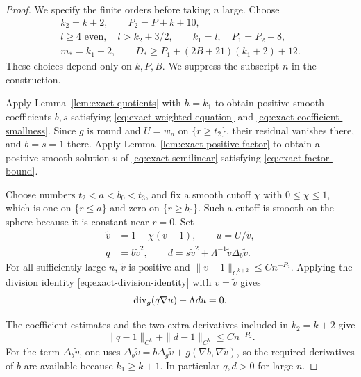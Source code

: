 \begin{proof}
We specify the finite orders before taking \(n\) large.  Choose
\begin{equation}
 \begin{gathered}
 k_2=k+2,\qquad P_2=P+k+10,\\
 l\ge4\text{ even},\quad l>k_2+3/2,\qquad
 k_1=l,\quad P_1=P_2+8,\\
 m_*=k_1+2,\qquad
 D_*\ge P_1+(2B+21)(k_1+2)+12.
 \end{gathered}
 \label{eq:exact-parameter-budget}
\end{equation}
These choices depend only on \(k,P,B\).  We suppress the subscript
\(n\) in the construction.

Apply Lemma~\ref{lem:exact-quotients} with \(h=k_1\) to obtain
positive smooth coefficients \(b,s\) satisfying
\eqref{eq:exact-weighted-equation} and
\eqref{eq:exact-coefficient-smallness}.  Since \(g\) is round and
\(U=w_n\) on \(\{r\ge t_2\}\), their residual vanishes there,
and \(b=s=1\) there.  Apply
Lemma~\ref{lem:exact-positive-factor} to obtain a positive smooth
solution \(v\) of \eqref{eq:exact-semilinear} satisfying
\eqref{eq:exact-factor-bound}.

Choose numbers \(t_2<a<b_0<t_3\), and fix a smooth cutoff \(\chi\)
with \(0\le\chi\le1\), which is one on \(\{r\le a\}\) and zero on
\(\{r\ge b_0\}\).
Such a cutoff is smooth on the sphere because it is constant near
\(r=0\).  Set
\begin{equation}
 \begin{aligned}
 \widetilde v&=1+\chi(v-1),\qquad u=U/\widetilde v,\\
 q&=b\widetilde v^2,\qquad
 d=s\widetilde v^2+\Lambda^{-1}\widetilde v\Delta_b\widetilde v.
 \end{aligned}
 \label{eq:exact-conjugation}
\end{equation}
For all sufficiently large \(n\), \(\widetilde v\) is positive and
\(\|\widetilde v-1\|_{C^{k+2}}\le Cn^{-P_2}\).  Applying the division
identity \eqref{eq:exact-division-identity} with
\(v=\widetilde v\) gives
\begin{equation}
 \operatorname{div}_g(q\nabla u)+\Lambda d u=0.
 \label{eq:exact-conjugated-equation}
\end{equation}

The coefficient estimates and the two extra derivatives included in
\(k_2=k+2\) give
\begin{equation}
 \|q-1\|_{C^k}+\|d-1\|_{C^k}\le Cn^{-P_2}.
 \label{eq:exact-density-estimates}
\end{equation}
For the term \(\Delta_b\widetilde v\), one uses
\(\Delta_b\widetilde v=b\Delta_g\widetilde v+
g(\nabla b,\nabla\widetilde v)\), so the required derivatives of
\(b\) are available because \(k_1\ge k+1\).
In particular \(q,d>0\) for large \(n\).


\end{proof}
